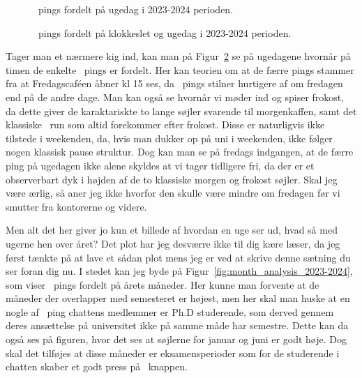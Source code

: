 \begin{article}
\begin{figure}[H]
	\centering
	\resizebox{\columnwidth}{!}{}
	\vspace{-20pt}
	\caption{\protect\coffee\ pings fordelt på ugedag i 2023-2024 perioden.}
	\label{fig:weekday_analysis_2023-2024}
\end{figure}
\begin{figure}[H]
	\centering
	\resizebox{\columnwidth}{!}{}
	\vspace{-20pt}
	\caption{\protect\coffee\ pings fordelt på klokkeslet og ugedag i 2023-2024 perioden.}
	\label{fig:weekday_analysis_hour_2023-2024}
\end{figure}

Tager man et nærmere kig ind, kan man på Figur~\ref{fig:weekday_analysis_hour_2023-2024} se på ugedagene hvornår på timen de enkelte \coffee\ pings er fordelt.
Her kan teorien om at de færre pings stammer fra at Fredagscaféen åbner kl 15 ses, da \coffee\ pings stilner hurtigere af om fredagen end på de andre dage. Man kan også se hvornår vi møder ind og spiser frokost, da dette giver de karaktariskte to lange søjler svarende til morgenkaffen, samt det klassiske \coffee\ run som altid forekommer efter frokost. Disse er naturligvis ikke tilstede i weekenden, da, hvis man dukker op på uni i weekenden, ikke følger nogen klassisk pause struktur.
Dog kan man se på fredags indgangen, at de færre ping på ugedagen ikke alene skyldes at vi tager tidligere fri, da der er et observerbart dyk i højden af de to klassiske morgen og frokost søjler. Skal jeg være ærlig, så aner jeg ikke hvorfor den skulle være mindre om fredagen før vi smutter fra kontorerne og videre.

Men alt det her giver jo kun et billede af hvordan en uge ser ud, hvad så med ugerne hen over året? Det plot har jeg desværre ikke til dig kære læser, da jeg først tænkte på at lave et sådan plot mens jeg er ved at skrive denne sætning du ser foran dig nu. I stedet kan jeg byde på Figur~\ref{fig:month_analysis_2023-2024}, som viser \coffee\ pings fordelt på årets måneder. Her kunne man forvente at de måneder der overlapper med semesteret er højest, men her skal man huske at en nogle af \coffee\ ping chattens medlemmer er Ph.D studerende, som derved gennem deres ansættelse på universitet ikke på samme måde har semestre. Dette kan da også ses på figuren, hvor det ses at søjlerne for januar og juni er godt høje. Dog skal det tilføjes at disse måneder er eksamensperioder som for de studerende i chatten skaber et godt press på \coffee\ knappen.


\end{article}
